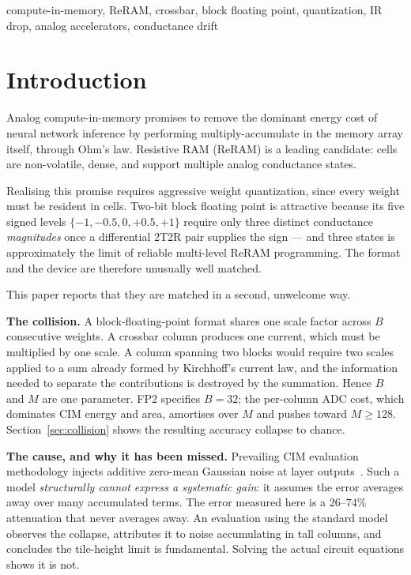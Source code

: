 \documentclass[conference,10pt]{IEEEtran}
\begin{document}
\begin{IEEEkeywords}
compute-in-memory, ReRAM, crossbar, block floating point, quantization,
IR drop, analog accelerators, conductance drift
\end{IEEEkeywords}

\section{Introduction}

Analog compute-in-memory promises to remove the dominant energy cost of neural
network inference by performing multiply-accumulate in the memory array itself,
through Ohm's law. Resistive RAM (ReRAM) is a leading candidate: cells are
non-volatile, dense, and support multiple analog conductance states.

Realising this promise requires aggressive weight quantization, since every
weight must be resident in cells. Two-bit block floating point is attractive
because its five signed levels $\{-1,-0.5,0,+0.5,+1\}$ require only three
distinct conductance \emph{magnitudes} once a differential 2T2R pair supplies
the sign --- and three states is approximately the limit of reliable multi-level
ReRAM programming. The format and the device are therefore unusually
well matched.

This paper reports that they are matched in a second, unwelcome way.

\textbf{The collision.} A block-floating-point format shares one scale factor
across $B$ consecutive weights. A crossbar column produces one current, which
must be multiplied by one scale. A column spanning two blocks would require two
scales applied to a sum already formed by Kirchhoff's current law, and the
information needed to separate the contributions is destroyed by the summation.
Hence $B$ and $M$ are one parameter. FP2 specifies $B{=}32$; the per-column ADC
cost, which dominates CIM energy and area, amortises over $M$ and pushes toward
$M{\geq}128$. Section~\ref{sec:collision} shows the resulting accuracy collapse
to chance.

\textbf{The cause, and why it has been missed.} Prevailing CIM evaluation
methodology injects additive zero-mean Gaussian noise at layer
outputs~\cite{neurosim}. Such a
model \emph{structurally cannot express a systematic gain}: it assumes the error
averages away over many accumulated terms. The error measured here is a
$26$--$74\%$ attenuation that never averages away. An evaluation using the
standard model observes the collapse, attributes it to noise accumulating in
tall columns, and concludes the tile-height limit is fundamental. Solving the
actual circuit equations shows it is not.
\end{document}
